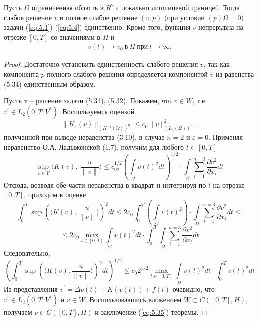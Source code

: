 \begin{theorem}
    Пусть $\Omega$ ограниченная область в $R^2$ с локально липшицевой границей. Тогда слабое решение $v$ и полное слабое решение $(v, p)$
    (при условии $(p) \Omega = 0$) задачи (\ref{eq:5.1})-(\ref{eq:5.4}) единственно. Кроме того, функция $v$ непрерывна на отрезке $[0, T]$ со значениями в $H$ и
    \begin{equation}\label{eq:5.35}
        \begin{gathered}
            v(t) \rightarrow v_0 \ \textrm{в} \ H \ \textrm{при} \ t \rightarrow \infty.
        \end{gathered}
    \end{equation}
\end{theorem}
\begin{proof}
    Достаточно установить единственность слабого решения $v$, так как компонента $p$ полного слабого решения определяется компонентой $v$
    из равенства (5.34) единственным образом.

    Пусть v -- решение задачи (5.31), (5.32). Покажем, что $v \in W$, т.е. $v^\prime \in L_2(0, T; V^\ast)$.
    Воспользуемся оценкой
    $$\| K_\varepsilon (v) \|_{(H^{-1}(\Omega))^n} \le c_0 \| v \|^2_{(L_4(\Omega))^n},$$
    полученной при выводе неравенства (3.10), в случае $n = 2$ и $\varepsilon = 0$. Применяя неравенство О.А. Ладыженской (1.7), получим для любого $t \in [0, T]$
    $$\sup\limits_{v\in V}\langle K(v), \ \frac{u}{\| v\|}
    \rangle\le c_02^{1/2}(\int\limits_\Omega v(t)^2dt)^{1/2}\cdot\int\limits_\Omega\sum_{i=1}^{n=3}\frac{\partial v^2}{\partial x_i}dt$$
    Отсюда, возводя обе части неравенства в квадрат и интегрируя по $t$ на отрезке $[0, T]$, приходим к оценке
    $$\int_0^T \sup(\langle K(v), \frac{u}{\| v\|}\rangle)^2dt \le 2c_0\int_0^T(\int\limits_\Omega v(t)^2)
    \cdot\int\limits_\Omega\sum_{i=1}^{n=3}\frac{\partial v^2}{\partial x_i}dt\le$$
    $$\le 2c_0 \max\limits_{t\in[0, T]}\int\limits_\Omega v(t)^2dt\cdot\int_0^T\int\limits_\Omega\sum_{i=1}^{n=3}\frac{\partial v^2}{\partial x_i}dt$$
    Следовательно,
    $$(\int_0^T \sup(\langle K(v), \frac{u}{\| v\|}\rangle)^2dt)^{1/2}\le c_0 2^{1/2}\max\limits_{t\in[0, T]}
    \int\limits_\Omega v(t)^2dt\cdot\int_0^T v(t)^2dt$$
    Из представления $v^\prime = \Delta v(t) + K(v(t)) + f(t)$ очевидно, что $v^\prime \in L_2(0, T; V^\ast)$ и $v \in W$.
    Воспользовавшись вложением $W \subset C([0, T], H)$, получаем $v \in C([0, T], H)$ и заключение (\ref{eq:5.35}) теоремы.


\end{proof}
